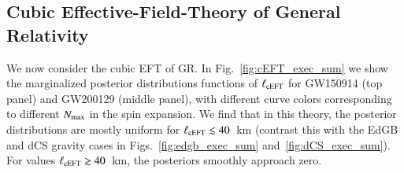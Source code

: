 \documentclass[twocolumn,
               prd,
               aps,
               superscriptaddress,
               tightenlines,
               nofootinbib,
               eqsecnum,
               amsfonts,
               amsmath,
               longbibliography]{revtex4-1}
\newcommand{\agcomm}[1]{{\textcolor{red}{{[AG: #1]}}}}
\begin{document}
%

\subsection{Cubic Effective-Field-Theory of General Relativity}
\label{sec:results_ceft}

We now consider the cubic EFT of GR.
%
In Fig.~\ref{fig:cEFT_exec_sum} we show the marginalized posterior distributions
functions of $\ell_{\rm cEFT}$ for GW150914 (top panel) and GW200129 (middle panel),
with different curve colors corresponding to different $N_{\rm max}$ in
the spin expansion.
%
We find that in this theory, the posterior distributions are mostly uniform for
$\ell_{\rm cEFT} \lesssim 40$~km (contrast this with the EdGB and dCS gravity
cases in Figs.~\ref{fig:edgb_exec_sum} and~\ref{fig:dCS_exec_sum}).
%
For values $\ell_{\rm cEFT} \gtrsim 40$~km, the posteriors smoothly approach zero.
\end{document}
